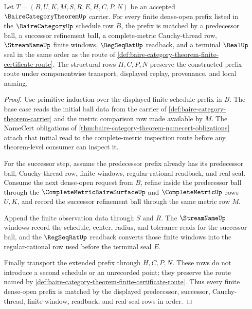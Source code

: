\begin{theorem}
\label{thm:baire-category-theorem-schedule-induction}
Let $T=(B,U,K,M,S,R,E,H,C,P,N)$ be an accepted $\BaireCategoryTheoremUp$ carrier. For every finite dense-open prefix listed in the $\BaireCategoryUp$ schedule row $B$, the prefix is matched by a predecessor ball, a successor refinement ball, a complete-metric Cauchy-thread row, $\StreamNameUp$ finite windows, $\RegSeqRatUp$ readback, and a terminal $\RealUp$ seal in the same order as the route of \autoref{def:baire-category-theorem-finite-certificate-route}. The structural rows $H,C,P,N$ preserve the constructed prefix route under componentwise transport, displayed replay, provenance, and local naming.
\end{theorem}
\begin{proof}
Use primitive induction over the displayed finite schedule prefix in $B$. The base case reads the initial ball data from the carrier of \autoref{def:baire-category-theorem-carrier} and the metric comparison row made available by $M$. The NameCert obligations of \autoref{thm:baire-category-theorem-namecert-obligations} attach that initial read to the complete-metric inspection route before any theorem-level consumer can inspect it.

For the successor step, assume the predecessor prefix already has its predecessor ball, Cauchy-thread row, finite windows, regular-rational readback, and real seal. Consume the next dense-open request from $B$, refine inside the predecessor ball through the $\CompleteMetricBaireSurfaceUp$ and $\CompleteMetricUp$ rows $U,K$, and record the successor refinement ball through the same metric row $M$.

Append the finite observation data through $S$ and $R$. The $\StreamNameUp$ windows record the schedule, center, radius, and tolerance reads for the successor ball, and the $\RegSeqRatUp$ readback converts those finite windows into the regular-rational row used before the terminal seal $E$.

Finally transport the extended prefix through $H,C,P,N$. These rows do not introduce a second schedule or an unrecorded point; they preserve the route named by \autoref{def:baire-category-theorem-finite-certificate-route}. Thus every finite dense-open prefix is matched by the displayed predecessor, successor, Cauchy-thread, finite-window, readback, and real-seal rows in order.
\end{proof}

